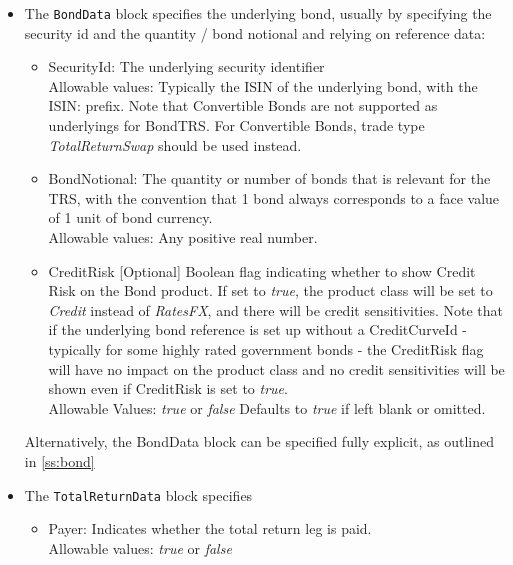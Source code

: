 \begin{itemize}
\item The {\tt BondData} block specifies the underlying bond, usually by specifying the security id and the quantity /
  bond notional and relying on reference data:

  \begin{itemize}
  \item SecurityId: The underlying security identifier\\
      Allowable values: Typically the ISIN of the underlying bond, with the ISIN: prefix.
      Note that Convertible Bonds are not supported as underlyings for BondTRS. For Convertible Bonds, trade type \emph{TotalReturnSwap} should be used instead.
  \item BondNotional: The quantity or number of bonds that is relevant for the TRS, with the convention that 1 bond always corresponds to a face value of 1 unit of bond currency.\\
      Allowable values: Any positive real number.
  \item CreditRisk [Optional] Boolean flag indicating whether to show Credit Risk on the Bond product. If set to \emph{true}, the product class will be set to \emph{Credit} instead of \emph{RatesFX}, and there will be credit sensitivities. Note that if the underlying bond reference is set up without a CreditCurveId - typically for some highly rated government bonds -  the CreditRisk flag will have no impact on the product class and no credit sensitivities will be shown even if CreditRisk is set to \emph{true}. \\
      Allowable Values: \emph{true} or \emph{false} Defaults to \emph{true} if left blank or omitted.
  \end{itemize}

  Alternatively, the BondData block can be specified fully explicit, as outlined in \ref{ss:bond}

\item The {\tt TotalReturnData} block specifies
  \begin{itemize}
  \item Payer: Indicates whether the total return leg is paid.\\
    Allowable values: \emph{true} or \emph{false}


\end{itemize}
\end{itemize}
